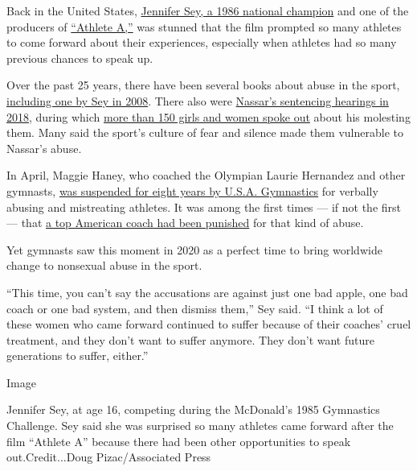 Back in the United States,
\href{https://www.nytimes3xbfgragh.onion/2017/03/30/opinion/sunday/how-gymnastics-culture-breeds-sexual-abuse.html}{Jennifer
Sey, a 1986 national champion} and one of the producers of
\href{https://www.rogerebert.com/reviews/athlete-a-movie-review-2020}{``Athlete
A,''} was stunned that the film prompted so many athletes to come
forward about their experiences, especially when athletes had so many
previous chances to speak up.

Over the past 25 years, there have been several books about abuse in the
sport,
\href{https://www.npr.org/templates/story/story.php?storyId=90105904}{including
one by Sey in 2008}. There also were
\href{https://www.nytimes3xbfgragh.onion/video/sports/100000005686677/gymnasts-confront-larry-nassar-over-sexual-abuse.html?searchResultPosition=8}{Nassar's
sentencing hearings in 2018}, during which
\href{https://www.nytimes3xbfgragh.onion/2018/01/24/sports/rachael-denhollander-nassar-gymnastics.html?searchResultPosition=28}{more
than 150 girls and women spoke out} about his molesting them. Many said
the sport's culture of fear and silence made them vulnerable to Nassar's
abuse.

In April, Maggie Haney, who coached the Olympian Laurie Hernandez and
other gymnasts,
\href{https://www.nytimes3xbfgragh.onion/2020/05/01/sports/maggie-haney-gymnastics-abuse.html}{was
suspended for eight years by U.S.A. Gymnastics} for verbally abusing and
mistreating athletes. It was among the first times --- if not the first
--- that
\href{https://www.nytimes3xbfgragh.onion/2020/04/29/sports/gymnastics-coach-banned-maggie-haney.html}{a
top American coach had been punished} for that kind of abuse.

Yet gymnasts saw this moment in 2020 as a perfect time to bring
worldwide change to nonsexual abuse in the sport.

``This time, you can't say the accusations are against just one bad
apple, one bad coach or one bad system, and then dismiss them,'' Sey
said. ``I think a lot of these women who came forward continued to
suffer because of their coaches' cruel treatment, and they don't want to
suffer anymore. They don't want future generations to suffer, either.''

Image

Jennifer Sey, at age 16, competing during the McDonald's 1985 Gymnastics
Challenge. Sey said she was surprised so many athletes came forward
after the film ``Athlete A'' because there had been other opportunities
to speak out.Credit...Doug Pizac/Associated Press

